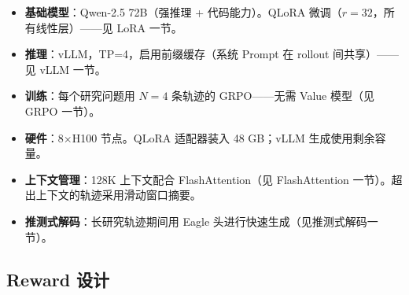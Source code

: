 \begin{keybox}
\begin{itemize}
  \item \textbf{基础模型}：Qwen-2.5 72B（强推理 + 代码能力）。QLoRA 微调（$r=32$，所有线性层）——见 LoRA 一节。
  \item \textbf{推理}：vLLM，TP=4，启用前缀缓存（系统 Prompt 在 rollout 间共享）——见 vLLM 一节。
  \item \textbf{训练}：每个研究问题用 $N=4$ 条轨迹的 GRPO——无需 Value 模型（见 GRPO 一节）。
  \item \textbf{硬件}：8$\times$H100 节点。QLoRA 适配器装入 48 GB；vLLM 生成使用剩余容量。
  \item \textbf{上下文管理}：128K 上下文配合 FlashAttention（见 FlashAttention 一节）。超出上下文的轨迹采用滑动窗口摘要。
  \item \textbf{推测式解码}：长研究轨迹期间用 Eagle 头进行快速生成（见推测式解码一节）。
\end{itemize}
\end{keybox}

\subsection{Reward 设计}
\label{reward-design}

